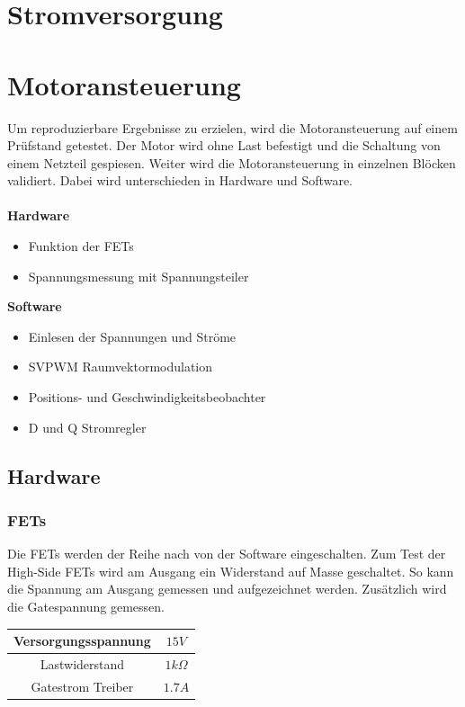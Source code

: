 \section{Stromversorgung} \label{ValidStromversorgung}

\section{Motoransteuerung} \label{ValidMotoransteuerung}
Um reproduzierbare Ergebnisse zu erzielen, wird die Motoransteuerung auf einem Prüfstand getestet. Der Motor wird ohne Last befestigt und die Schaltung von einem Netzteil gespiesen. Weiter wird die Motoransteuerung in einzelnen Blöcken validiert. Dabei wird unterschieden in Hardware und Software.\\
\\
\textbf{Hardware}
\begin{itemize}
	\item Funktion der FETs
	\item Spannungsmessung mit Spannungsteiler
\end{itemize}
\textbf{Software}
\begin{itemize}
	\item Einlesen der Spannungen und Ströme
	\item SVPWM Raumvektormodulation
	\item Positions- und Geschwindigkeitsbeobachter
	\item D und Q Stromregler
\end{itemize}

\subsection*{Hardware}
\subsubsection*{FETs}
Die FETs werden der Reihe nach von der Software eingeschalten. Zum Test der High-Side FETs wird am Ausgang ein Widerstand auf Masse geschaltet. So kann die Spannung am Ausgang gemessen und aufgezeichnet werden. Zusätzlich wird die Gatespannung gemessen.

\begin{center}
	\begin{tabular}{|c|c|}
		\hline 
		Versorgungsspannung & $15V$ \\ \hline
		Lastwiderstand & $1k\Omega$ \\ \hline
		Gatestrom Treiber & $1.7A$ \\ \hline
	\end{tabular} 
	\label{tab:fetmessbed}
\end{center}

